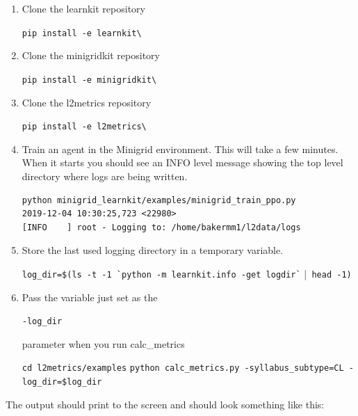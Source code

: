\begin{enumerate}

\item Clone the learnkit repository\\
\begin{small}
\verb|pip install -e learnkit\|\\[0.1in]
\end{small}

\item Clone the minigridkit repository\\
\begin{small}
\verb|pip install -e minigridkit\|\\[0.1in]
\end{small}

\item Clone the l2metrics repository\\
\begin{small}
\verb|pip install -e l2metrics\|\\[0.1in]
\end{small}

\item Train an agent in the Minigrid environment. This will take a few minutes. When it starts you should see an INFO level message showing the top level directory where logs are being written.\\[0.1in]
\begin{small}
\begin{verbatim}python minigrid_learnkit/examples/minigrid_train_ppo.py
2019-12-04 10:30:25,723 <22980>
[INFO    ] root - Logging to: /home/bakermm1/l2data/logs
\end{verbatim}
\end{small}

\item Store the last used logging directory in a temporary variable.\\
\begin{small}
\verb|log_dir=$(ls -t -1 `python -m learnkit.info -get logdir`| |\verb| head -1)|\\[0.1in]
\end{small}
\item Pass the variable just set as the 
\begin{small}
\verb|-log_dir|
\end{small}parameter when you run calc\_metrics\\
\begin{small}
\verb|cd l2metrics/examples|
\verb|python calc_metrics.py -syllabus_subtype=CL -log_dir=$log_dir|\\[0.2in]
\end{small}
\end{enumerate}
The output should print to the screen and should look something like this:\\[0.2in]

